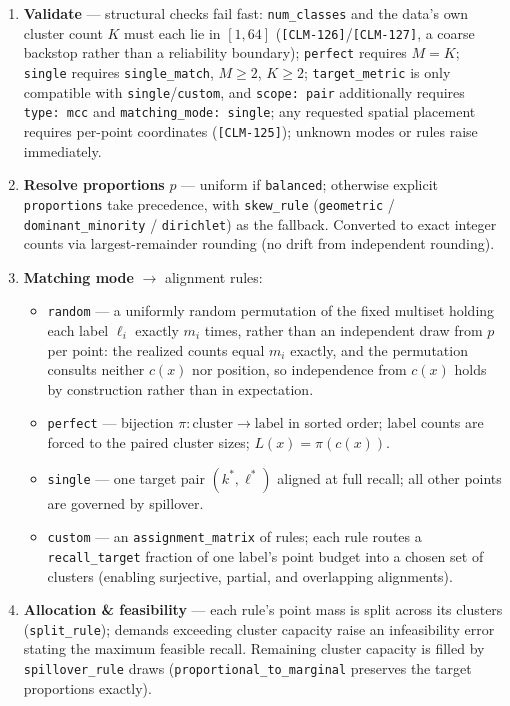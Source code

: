 \documentclass[a4paper,12pt]{article}
\begin{document}
\begin{enumerate}
    \item \textbf{Validate} — structural checks fail fast: \texttt{num\_classes} and the data's own cluster count $K$ must each lie in $[1,64]$ (\texttt{[CLM-126]}/\texttt{[CLM-127]}, a coarse backstop rather than a reliability boundary); \texttt{perfect} requires $M = K$; \texttt{single} requires \texttt{single\_match}, $M \ge 2$, $K \ge 2$; \texttt{target\_metric} is only compatible with \texttt{single}/\texttt{custom}, and \texttt{scope: pair} additionally requires \texttt{type: mcc} and \texttt{matching\_mode: single}; any requested spatial placement requires per-point coordinates (\texttt{[CLM-125]}); unknown modes or rules raise immediately.
    \item \textbf{Resolve proportions} $p$ — uniform if \texttt{balanced}; otherwise explicit \texttt{proportions} take precedence, with \texttt{skew\_rule} (\texttt{geometric} / \texttt{dominant\_minority} / \texttt{dirichlet}) as the fallback. Converted to exact integer counts via largest-remainder rounding (no drift from independent rounding).
    \item \textbf{Matching mode} $\to$ alignment rules:
    \begin{itemize}
        \item \texttt{random} — a uniformly random permutation of the fixed multiset holding each label $\ell_i$ exactly $m_i$ times, rather than an independent draw from $p$ per point: the realized counts equal $m_i$ exactly, and the permutation consults neither $c(x)$ nor position, so independence from $c(x)$ holds by construction rather than in expectation.
        \item \texttt{perfect} — bijection $\pi: \text{cluster} \to \text{label}$ in sorted order; label counts are forced to the paired cluster sizes; $L(x) = \pi(c(x))$.
        \item \texttt{single} — one target pair $(k^*, \ell^*)$ aligned at full recall; all other points are governed by spillover.
        \item \texttt{custom} — an \texttt{assignment\_matrix} of rules; each rule routes a \texttt{recall\_target} fraction of one label's point budget into a chosen set of clusters (enabling surjective, partial, and overlapping alignments).
    \end{itemize}
    \item \textbf{Allocation \& feasibility} — each rule's point mass is split across its clusters (\texttt{split\_rule}); demands exceeding cluster capacity raise an infeasibility error stating the maximum feasible recall. Remaining cluster capacity is filled by \texttt{spillover\_rule} draws (\texttt{proportional\_to\_marginal} preserves the target proportions exactly).

\end{enumerate}
\end{document}
